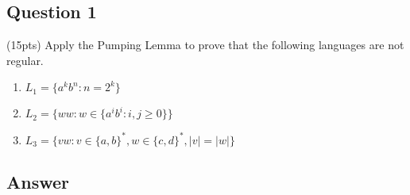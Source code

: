 \newpage
\subsection*{Question 1}

\noindent (15pts) Apply the Pumping Lemma to prove that the following languages are not regular.
    
    \begin{enumerate}[label={(\alph*)}]
        \item $L_1 = \{a^k b^n : n = 2^k\}$
        \item $L_2 = \{ww : w \in \{a^i b^i : i, j \geq 0\}\}$
        \item $L_3 = \{vw : v \in \{a, b\}^*, w \in \{c, d\}^*, |v| = |w|\}$
    \end{enumerate}


\subsection*{Answer}

